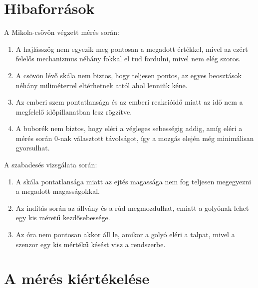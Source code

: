 \documentclass[10pt,pdftex]{report}
\begin{document}
\section*{Hibaforrások}
A Mikola-csövön végzett mérés során:
\begin{enumerate}
    \item{A hajlásszög nem egyezik meg pontosan a megadott értékkel, mivel az ezért felelős mechanizmus néhány fokkal el tud fordulni, mivel nem elég szoros.}
    \item{A csövön lévő skála nem biztos, hogy teljesen pontos, az egyes beosztások néhány miliméterrel eltérhetnek attól ahol lenniük kéne.}
    \item{Az emberi szem pontatlansága és az emberi reakcióidő miatt az idő nem a megfelelő időpillanatban lesz rögzítve.}
    \item{A buborék nem biztos, hogy eléri a végleges sebességig addig, amíg eléri a mérés során 0-nak választott távolságot, így a mozgás elején még minimálisan gyorsulhat.}
\end{enumerate}


A szabadesés vizsgálata során:
\begin{enumerate}
    \item{A skála pontatlansága miatt az ejtés magassága nem fog teljesen megegyezni a megadott magasságokkal.}
    \item{Az indítás során az állvány és a rúd megmozdulhat, emiatt a golyónak lehet egy kis méretű kezdősebessége.}
    \item{Az óra nem pontosan akkor áll le, amikor a golyó eléri a talpat, mivel a szenzor egy kis mértékű késést visz a rendszerbe.}
\end{enumerate}
\section*{A mérés kiértékelése}
\end{document}
